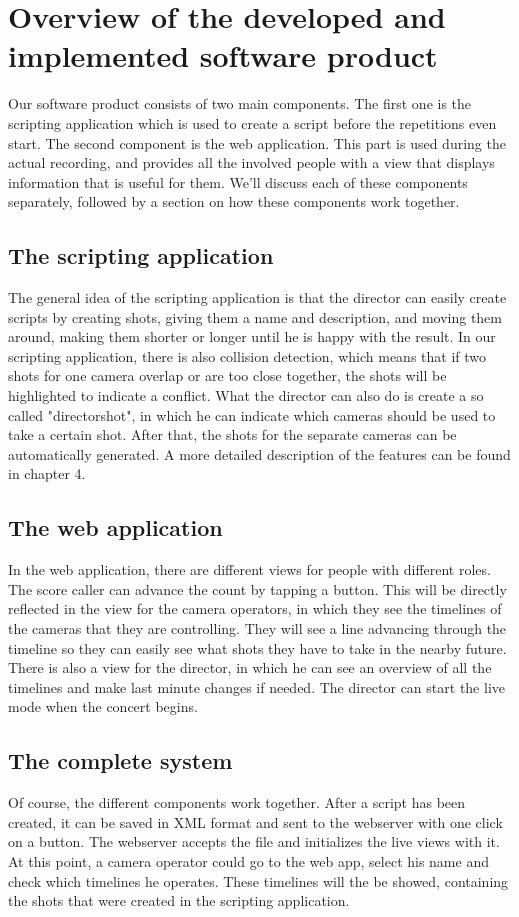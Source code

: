 \section{Overview of the developed and implemented software product}

Our software product consists of two main components. The first one is the scripting application which is used to create a script before the repetitions even start. The second component is the web application. This part is used during the actual recording, and provides all the involved people with a view that displays information that is useful for them. We'll discuss each of these components separately, followed by a section on how these components work together.

\subsection{The scripting application}
The general idea of the scripting application is that the director can easily create scripts by creating shots, giving them a name and description, and moving them around, making them shorter or longer until he is happy with the result. In our scripting application, there is also collision detection, which means that if two shots for one camera overlap or are too close together, the shots will be highlighted to indicate a conflict. What the director can also do is create a so called "directorshot", in which he can indicate which cameras should be used to take a certain shot. After that, the shots for the separate cameras can be automatically generated. A more detailed description of the features can be found in chapter 4.

\subsection{The web application}
In the web application, there are different views for people with different roles. The score caller can advance the count by tapping a button. This will be directly reflected in the view for the camera operators, in which they see the timelines of the cameras that they are controlling. They will see a line advancing through the timeline so they can easily see what shots they have to take in the nearby future. There is also a view for the director, in which he can see an overview of all the timelines and make last minute changes if needed. The director can start the live mode when the concert begins.

\subsection{The complete system}
Of course, the different components work together. After a script has been created, it can be saved in XML format and sent to the webserver with one click on a button. The webserver accepts the file and initializes the live views with it. At this point, a camera operator could go to the web app, select his name and check which timelines he operates. These timelines will the be showed, containing the shots that were created in the scripting application.\\
